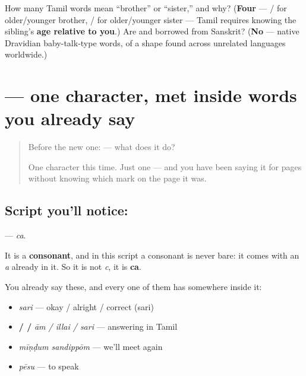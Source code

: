 \begin{tcolorbox}[breakable,colback=teal!4,colframe=teal!35!black,title={Before you move on}]
How many Tamil words mean \textquotedblleft{}brother\textquotedblright{} or \textquotedblleft{}sister,\textquotedblright{} and why? (\textbf{Four} — / for older/younger brother, / for older/younger sister — Tamil requires knowing the sibling's \textbf{age relative to you}.) Are  and  borrowed from Sanskrit? (\textbf{No} — native Dravidian baby-talk-type words, of a shape found across unrelated languages worldwide.)
\end{tcolorbox}
\section[\texorpdfstring{\ta{ச} (ca)}{ச (ca)}]{ — one character, met inside words you already say}

\label{lesson:TA-S116-letter-ca}



\begin{quote}
Before the new one:  — what does it do?

One character this time. Just one — and you have been saying it for pages without knowing which mark on the page it was.
\end{quote}

\subsection*{Script you'll notice: }
\textbf{} — \emph{ca}.

It is a \textbf{consonant}, and in this script a consonant is never bare: it comes with an \emph{a} already in it. So it is not \emph{c}, it is \textbf{ca}.

You already say these, and every one of them has  somewhere inside it:

\begin{itemize}
\raggedright
  \item \textbf{} \emph{sari} — okay / alright / correct (sari)
  \item \textbf{ /  / } \emph{ām / illai / sari} — answering in Tamil
  \item \textbf{ } \emph{mīṇḍum sandippōm} — we'll meet again
  \item \textbf{} \emph{pēsu} — to speak
\end{itemize}

